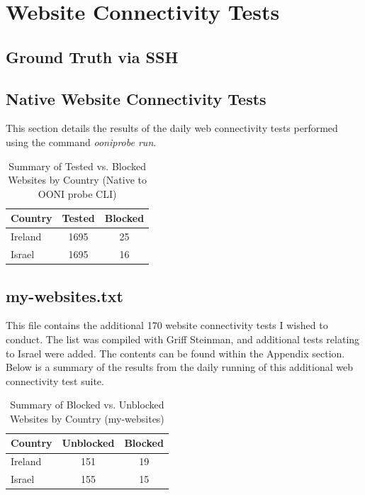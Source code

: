 \section{Website Connectivity Tests}


\subsection{Ground Truth via SSH}
\subsection{Native Website Connectivity Tests}
This section details the results of the daily web connectivity tests performed using the command \textit{ooniprobe run}. 

\begin{table}[H]
\centering
\caption{Summary of Tested vs. Blocked Websites by Country (Native to OONI probe CLI)}
\begin{tabular}{lcc}
\toprule
\textbf{Country} & \textbf{Tested} & \textbf{Blocked} \\
\midrule
Ireland & 1695 & 25 \\
Israel    & 1695 & 16 \\   
\bottomrule
\end{tabular}
\label{tab:blocked_summary}
\end{table}




\subsection{my-websites.txt}
This file contains the additional 170 website connectivity tests I wished to conduct. The list was compiled with Griff Steinman, and additional tests relating to Israel were added. The contents can be found within the Appendix section. Below is a summary of the results from the daily running of this additional web connectivity test suite.

\begin{table}[H]
\centering
\caption{Summary of Blocked vs. Unblocked Websites by Country (my-websites)}
\begin{tabular}{lcc}
\toprule
\textbf{Country} & \textbf{Unblocked} & \textbf{Blocked} \\
\midrule
Ireland & 151 & 19 \\
Israel    & 155 & 15 \\   
\bottomrule
\end{tabular}
\label{tab:blocked_summary}
\end{table}


